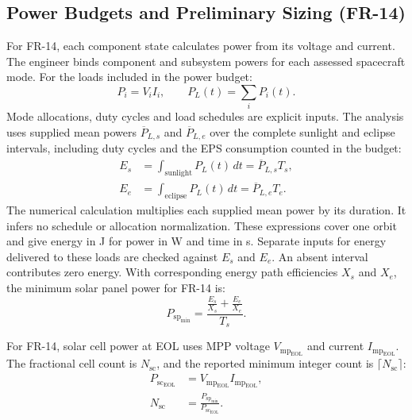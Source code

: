 \subsection{Power Budgets and Preliminary Sizing (FR-14)}
For FR-14, each component state calculates power from its voltage and current. The engineer binds component and subsystem powers for each assessed spacecraft mode. For the loads included in the power budget:
\begin{equation}
    P_i=V_i I_i,\qquad P_L(t)=\sum_i P_i(t).
    \label{eq:state-load-power}
\end{equation}
Mode allocations, duty cycles and load schedules are explicit inputs. The analysis uses supplied mean powers $\overline P_{L,s}$ and $\overline P_{L,e}$ over the complete sunlight and eclipse intervals, including duty cycles and the EPS consumption counted in the budget:
\begin{align}
    E_s &= \int_{\mathrm{sunlight}}P_L(t)\,dt=\overline P_{L,s}T_s,
    \label{eq:sunlight-load-energy} \\
    E_e &= \int_{\mathrm{eclipse}}P_L(t)\,dt=\overline P_{L,e}T_e.
    \label{eq:eclipse-load-energy}
\end{align}
The numerical calculation multiplies each supplied mean power by its duration. It infers no schedule or allocation normalization. These expressions cover one orbit and give energy in J for power in W and time in s. Separate inputs for energy delivered to these loads are checked against $E_s$ and $E_e$. An absent interval contributes zero energy. With corresponding energy path efficiencies $X_s$ and $X_e$, the minimum solar panel power for FR-14 is:
\begin{equation}
    P_{\mathrm{sp}_{\min}} = \frac{\frac{E_s}{X_s}+\frac{E_e}{X_e}}{T_s}.
    \label{eq:minimum-panel-power}
\end{equation}

For FR-14, solar cell power at EOL uses MPP voltage $V_{\mathrm{mp}_{\mathrm{EOL}}}$ and current $I_{\mathrm{mp}_{\mathrm{EOL}}}$. The fractional cell count is $N_{\mathrm{sc}}$, and the reported minimum integer count is $\lceil N_{\mathrm{sc}}\rceil$:
\begin{align}
    P_{\mathrm{sc}_{\mathrm{EOL}}} &= V_{\mathrm{mp}_{\mathrm{EOL}}} I_{\mathrm{mp}_{\mathrm{EOL}}},
    \label{eq:solar-cell-eol-power} \\
    N_{\mathrm{sc}} &= \frac{P_{\mathrm{sp}_{\min}}}{P_{\mathrm{sc}_{\mathrm{EOL}}}}.
    \label{eq:solar-cell-count}
\end{align}


